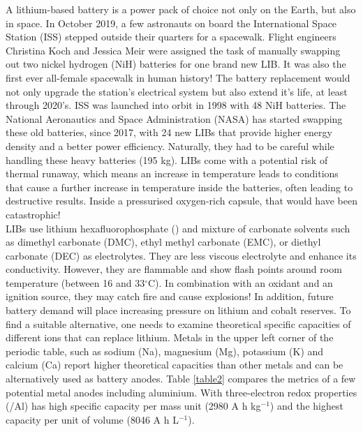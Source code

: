 A lithium-based battery is a power pack of choice not only on the Earth, but also in space. In October 2019, a few astronauts on board the International Space Station (ISS) stepped outside their quarters for a spacewalk. Flight engineers Christina Koch and Jessica Meir were assigned the task of manually swapping out two nickel hydrogen (NiH) batteries for one brand new LIB. It was also the first ever all-female spacewalk in human history! The battery replacement would not only upgrade the station's electrical system but also extend it's life, at least through 2020's. ISS was launched into orbit in 1998 with 48 NiH batteries. The National Aeronautics and Space Administration (NASA) has started swapping these old batteries, since 2017, with 24 new LIBs  that provide higher energy density and a better power efficiency. Naturally, they had to be careful while handling these heavy batteries (195 kg). LIBs come with a potential risk of thermal runaway, which means an increase in temperature leads to conditions that cause a further increase in temperature inside the batteries, often leading to destructive results. Inside a pressurised oxygen-rich capsule, that would have been catastrophic!\\
LIBs use lithium hexafluorophosphate () and mixture of carbonate solvents such as dimethyl carbonate (DMC), ethyl methyl carbonate (EMC), or diethyl carbonate (DEC) as electrolytes. They are less viscous electrolyte and enhance its conductivity. However, they are flammable and show flash points around room temperature (between 16 and 33$^{\circ}$C). In combination with an oxidant and an ignition source, they may catch fire and cause explosions! In addition, future battery demand will place increasing pressure on lithium and cobalt reserves\cite{turcheniuk_ten_2018}. To find a suitable alternative, one needs to examine theoretical specific capacities of different ions that can replace lithium. Metals in the upper left corner of the periodic table, such as sodium (Na), magnesium (Mg), potassium (K) and calcium (Ca) report higher theoretical capacities than other metals and can be alternatively used as battery anodes. Table  \ref{table2} compares the metrics of a few potential metal anodes including aluminium. With three-electron redox properties (/Al) has high specific capacity per mass unit (2980 A h kg$^{-1}$) and the highest capacity per unit of volume (8046 A h L$^{-1}$)\cite{ambroz_trends_2017-1}.

